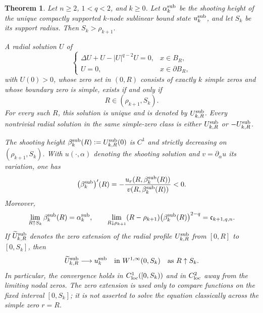 \documentclass[11pt]{article}
\newtheorem{theorem}{Theorem}[section]
\begin{document}
\begin{theorem}\label{thm:sub-main}
Let $n\ge2$, $1<q<2$, and $k\ge0$. Let $\alpha_k^{\rm sub}$ be the
shooting height of the unique compactly supported $k$-node sublinear bound
state $u_k^{\rm sub}$, and let $S_k$ be its support radius. Then
$S_k>\rho_{k+1}$.

A radial solution $U$ of
\begin{equation}\label{eq:main-sub-ball}
 \begin{cases}
 \Delta U+U-|U|^{q-2}U=0,&x\in B_R,\\
 U=0,&x\in\partial B_R,
 \end{cases}
\end{equation}
with $U(0)>0$, whose zero set in $(0,R)$ consists of exactly $k$ simple
zeros and whose boundary zero is simple, exists if and only if
\[
 R\in(\rho_{k+1},S_k).
\]
For every such $R$, this solution is unique and is denoted by
$U^{\rm sub}_{k,R}$. Every nontrivial radial solution in the same
simple-zero class is either $U^{\rm sub}_{k,R}$ or
$-U^{\rm sub}_{k,R}$.

The shooting height $\beta_k^{\rm sub}(R):=U^{\rm sub}_{k,R}(0)$ is
$C^1$ and strictly decreasing on $(\rho_{k+1},S_k)$. With
$u(\cdot,\alpha)$ denoting the shooting solution and
$v=\partial_\alpha u$ its variation, one has
\begin{equation*}
 \bigl(\beta_k^{\rm sub}\bigr)'(R)
 =-\frac{u_r(R,\beta_k^{\rm sub}(R))}
 {v(R,\beta_k^{\rm sub}(R))}<0.
\end{equation*}
Moreover,
\begin{equation}\label{eq:main-sub-limits}
 \lim_{R\uparrow S_k}\beta_k^{\rm sub}(R)=\alpha_k^{\rm sub},
 \qquad
 \lim_{R\downarrow\rho_{k+1}}
 (R-\rho_{k+1})\bigl(\beta_k^{\rm sub}(R)\bigr)^{2-q}
 =\mathfrak c_{k+1,q,n}.
\end{equation}
If $\widetilde U^{\rm sub}_{k,R}$ denotes the zero extension of the
{radial profile} $U^{\rm sub}_{k,R}$ from {$[0,R]$ to $[0,S_k]$}, then
\begin{equation}\label{eq:main-sub-convergence}
 \widetilde U^{\rm sub}_{k,R}\longrightarrow u_k^{\rm sub}
 \quad\text{in }W^{1,\infty}(0,S_k)
 \quad\text{as }R\uparrow S_k.
\end{equation}
In particular, the convergence holds {in $C^1_{\rm loc}([0,S_k))$ and in
$C^2_{\rm loc}$ away from the limiting nodal zeros}.
The zero extension is used only to compare functions on the fixed interval
$[0,S_k]$; it is not asserted to solve the equation classically across the
simple zero $r=R$.


\end{theorem}
\end{document}
